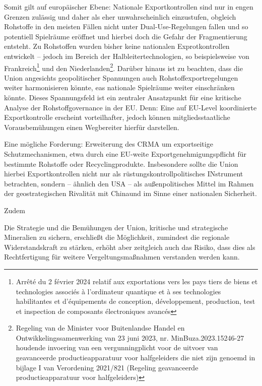 \documentclass[12pt,a4paper,oneside]{book} %
\begin{document}
Somit gilt auf europäischer Ebene: Nationale Exportkontrollen sind nur in engen Grenzen zulässig und daher als eher unwahrscheinlich einzustufen, obgleich Rohstoffe in den meisten Fällen nicht unter Dual-Use-Regelungen fallen und so potentiell Spielräume eröffnet und hierbei doch die Gefahr der Fragmentierung entsteht. Zu Rohstoffen wurden bisher keine nationalen Exprotkontrollen entwickelt -- jedoch im Bereich der Halbleitertechnologien, so beispielsweise von Frankreich\footnote{Arrêté du 2 février 2024 relatif aux exportations vers les pays tiers de biens et technologies associés à l'ordinateur quantique et à ses technologies habilitantes et d'équipements de conception, développement, production, test et inspection de composants électroniques avancés} und den Niederlanden\footnote{Regeling van de Minister voor Buitenlandse Handel en Ontwikkelingssamenwerking van 23 juni 2023, nr. MinBuza.2023.15246-27 houdende invoering van een vergunningplicht voor de uitvoer van geavanceerde productieapparatuur voor halfgeleiders die niet zijn genoemd in bijlage I van Verordening 2021/821 (Regeling geavanceerde productieapparatuur voor halfgeleiders)}.
Darüber hinaus ist zu beachten, dass die Union angesichts geopolitischer Spannungen auch Rohstoffexportregelungen weiter harmonisieren könnte, eas nationale Spielräume weiter einschränken könnte. Dieses Spannungsfeld ist ein zentraler Ansatzpunkt für eine kritische Analyse der Rohstoffgovernance in der EU. Denn: Eine auf EU-Level koordinierte Exportkontrolle erscheint vorteilhafter, jedoch können mitgliedsstaatliche Vorausbemühungen einen Wegbereiter hierfür darstellen.\autocite{Medunic, Nr 15 Juli 2024, S. 3}

Eine mögliche Forderung: Erweiterung des CRMA um exportseitige Schutzmechanismen, etwa durch eine EU-weite Exportgenehmigungspflicht für bestimmte Rohstoffe oder Recyclingprodukte. Insbesondere sollte die Union hierbei Exportkontrollen nicht nur als rüstungskontrollpolitisches INstrument betrachten, sondern -- ähnlich den USA -- als \glqq außenpolitisches Mittel im Rahmen der geostrategischen Rivalität mit China\grqq und im Sinne einer nationalen Sicherheit.\autocite{Medunic, Nr 15 Juli 2024, S. 3}

Zudem 

Die Strategie und die Bemühungen der Union, kritische und strategische Mineralien zu sichern, erschließt die Möglichkeit, zumindest die regionale Widerstandskraft zu stärken, erhöht aber zeitgleich auch das Risiko, dass dies als Rechtfertigung für weitere Vergeltungsmaßnahmen verstanden werden kann.\autocite[siehe auch]{Schroeder, Patrick: Letter: Race for critical minerals sparks call for new materials agency, FT, July 14 2025}
\end{document}
